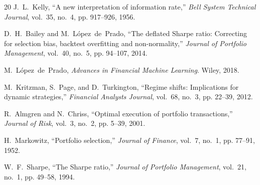 \documentclass[10pt,twocolumn]{IEEEtran}
\begin{document}
\begin{thebibliography}{20}
J.~L.~Kelly, ``A new interpretation of information rate,'' \emph{Bell
System Technical Journal}, vol.~35, no.~4, pp. 917--926, 1956.

D.~H.~Bailey and M.~L\'opez~de~Prado, ``The deflated Sharpe ratio:
Correcting for selection bias, backtest overfitting and non-normality,''
\emph{Journal of Portfolio Management}, vol.~40, no.~5, pp. 94--107, 2014.

M.~L\'opez~de~Prado, \emph{Advances in Financial Machine Learning}.
Wiley, 2018.

M.~Kritzman, S.~Page, and D.~Turkington, ``Regime shifts: Implications for
dynamic strategies,'' \emph{Financial Analysts Journal}, vol.~68, no.~3,
pp. 22--39, 2012.

R.~Almgren and N.~Chriss, ``Optimal execution of portfolio transactions,''
\emph{Journal of Risk}, vol.~3, no.~2, pp. 5--39, 2001.

H.~Markowitz, ``Portfolio selection,'' \emph{Journal of Finance}, vol.~7,
no.~1, pp. 77--91, 1952.

W.~F.~Sharpe, ``The Sharpe ratio,'' \emph{Journal of Portfolio Management},
vol.~21, no.~1, pp. 49--58, 1994.

\end{thebibliography}
\end{document}
